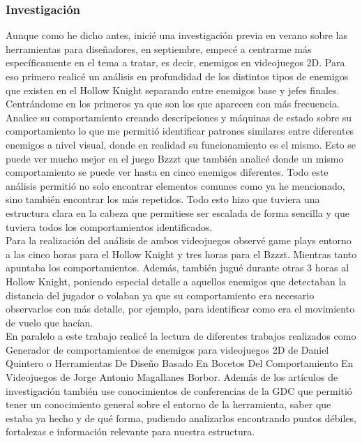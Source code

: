 \subsubsection*{Investigación}
Aunque como he dicho antes, inicié una investigación previa en verano sobre las herramientas para diseñadores, en septiembre, empecé a centrarme más específicamente en el tema a tratar, es decir, enemigos en videojuegos 2D. Para eso primero realicé un análisis en profundidad de los distintos tipos de enemigos que existen en el Hollow Knight separando entre enemigos base y jefes finales. Centrándome en los primeros ya que son los que aparecen con más frecuencia. Analice su comportamiento creando descripciones y máquinas de estado sobre su comportamiento lo que me permitió identificar patrones similares entre diferentes enemigos a nivel visual, donde en realidad su funcionamiento es el mismo. Esto se puede ver mucho mejor en el juego Bzzzt que también analicé donde un mismo comportamiento se puede ver hasta en cinco enemigos diferentes. Todo este análisis permitió no solo encontrar elementos comunes como ya he mencionado, sino también encontrar los más repetidos.
Todo esto hizo que tuviera una estructura clara en la cabeza que permitiese ser escalada de forma sencilla y que tuviera todos los comportamientos identificados. \\
Para la realización del análisis de ambos videojuegos observé game plays entorno a las cinco horas para el Hollow Knight y tres horas para el Bzzzt. Mientras tanto apuntaba los comportamientos. Además, también jugué durante otras 3 horas al Hollow Knight, poniendo especial detalle a aquellos enemigos que detectaban la distancia del jugador o volaban ya que su comportamiento era necesario observarlos con más detalle, por ejemplo, para identificar como era el movimiento de vuelo que hacían.\\

En paralelo a este trabajo realicé la lectura de diferentes trabajos realizados como Generador de comportamientos de enemigos para videojuegos 2D de Daniel Quintero o Herramientas De Diseño Basado En Bocetos Del Comportamiento En Videojuegos de Jorge Antonio Magallanes Borbor. Además de los artículos de investigación también use conocimientos de conferencias de la GDC que permitió tener un conocimiento general sobre el  entorno de la herramienta, saber que estaba ya hecho y de qué forma, pudiendo analizarlos encontrando puntos débiles, fortalezas e información relevante para nuestra estructura.

